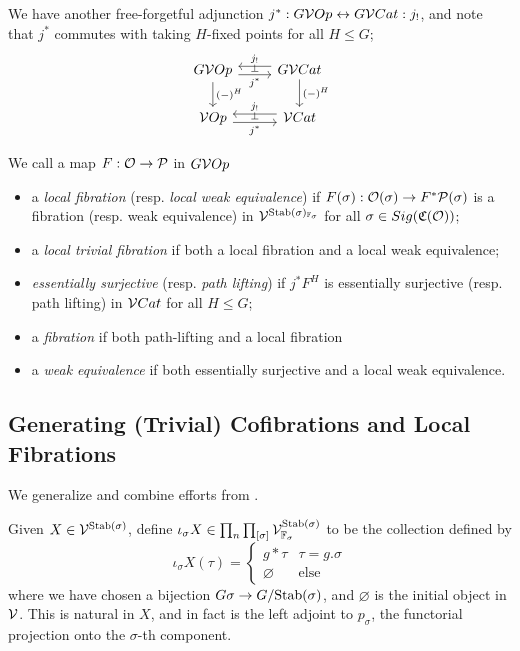 \documentclass[psamsfonts,onesided,10pt,letterpaper]{amsart}%
\renewcommand{\C}{\ensuremath{\mathfrak{C}}}
\renewcommand{\P}{\ensuremath{\mathcal{P}}}
\newcommand{\Vsigma}{\ensuremath{\V^{\Stab(\sigma)}_{\F_\sigma}}}
\begin{document}
We have another free-forgetful adjunction $j^*: G\mathcal V Op \leftrightarrow G\mathcal V Cat: j_!$, and note that $j^*$ commutes with taking $H$-fixed points for all $H\leq G$;
\[
\begin{tikzcd}
  G\V Op \arrow[d, "(-)^H"] \arrow[r, yshift=-.3em, "j^*"', "\perp"] & G\V Cat \arrow[l, yshift=.3em, swap, "j_!"] \arrow[d, "(-)^H"] \\
  \V Op \arrow[r, yshift=-.3em, "j^*"', "\perp"] & \V Cat \arrow[l, yshift=.3em, swap, "j_!"]
\end{tikzcd}
\]

\begin{definition}
  We call a map $F: \O \to \P$ in $G\mathcal V Op$
  \begin{itemize}
  \item a {\em local fibration} (resp. {\em local weak equivalence}) if $F(\sigma): \O(\sigma)\to F^*\P(\sigma)$ is a fibration (resp. weak equivalence) in $\mathcal V^{\mathrm{Stab}(\sigma)_{\mathbb{F}_\sigma}}$ for all $\sigma\in Sig(\C(\O))$;
  \item a {\em local trivial fibration} if both a local fibration and a local weak equivalence;
  \item {\em essentially surjective} (resp. {\em path lifting}) if $j^*F^H$ is essentially surjective (resp. path lifting) in $\mathcal V Cat$ for all $H\leq G$;
  \item a {\em fibration} if both path-lifting and a local fibration
  \item a {\em weak equivalence} if both essentially surjective and a local weak equivalence.
  \end{itemize}
\end{definition}

\subsection{Generating (Trivial) Cofibrations and Local Fibrations}

We generalize and combine efforts from \cite{CM1, BM13, Cav14}.

Given $X\in \mathcal V^{\mathrm{Stab}(\sigma)}$, define $\iota_\sigma X\in \prod_n\prod_{[\sigma]}\Vsigma$ to be the collection defined by
\[
\iota_\sigma X(\tau) =
  \begin{cases}
    g*\tau & \tau = g.\sigma\\
    \varnothing & \mbox{else}
  \end{cases}
\]
where we have chosen a bijection $G\sigma \to G/\mathrm{Stab}(\sigma)$, and $\varnothing$ is the initial object in $\mathcal V$. This is natural in $X$, and in fact is the left adjoint to $p_\sigma$, the functorial projection onto the $\sigma$-th component. 
\end{document}
